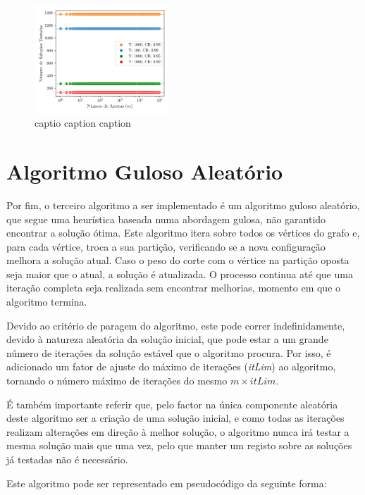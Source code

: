 \documentclass[mirror, portugues]{revdetua}
\begin{document}

\begin{figure}[H]
    \centering
    \includegraphics[width=0.45\textwidth]{../assets/sols_Simulated .png}
    \caption{captio caption caption}
    \label{fig:sols_satested}
\end{figure}


\section{Algoritmo Guloso Aleatório}

Por fim, o terceiro algoritmo a ser implementado é um algoritmo guloso aleatório, que segue uma heurística baseada numa abordagem gulosa, não garantido encontrar a solução ótima. Este algoritmo itera sobre todos os vértices do grafo e, para cada vértice, troca a sua partição, verificando se a nova configuração melhora a solução atual. Caso o peso do corte com o vértice na partição oposta seja maior que o atual, a solução é atualizada. O processo continua até que uma iteração completa seja realizada sem encontrar melhorias, momento em que o algoritmo termina.

Devido ao critério de paragem do algoritmo, este pode correr indefinidamente, devido à natureza aleatória da solução inicial, que pode estar a um grande número de iterações da solução estável que o algoritmo procura. Por isso, é adicionado um fator de ajuste do máximo de iterações (\textit{itLim}) ao algoritmo, tornando o número máximo de iterações do mesmo $m \times itLim$.

É também importante referir que, pelo factor na única componente aleatória deste algoritmo ser a criação de uma solução inicial, e como todas as iterações realizam alterações em direção à melhor solução, o algoritmo nunca irá testar a mesma solução mais que uma vez, pelo que manter um registo sobre as soluções já testadas não é necessário.

Este algoritmo pode ser representado em pseudocódigo da seguinte forma:
\end{document}
